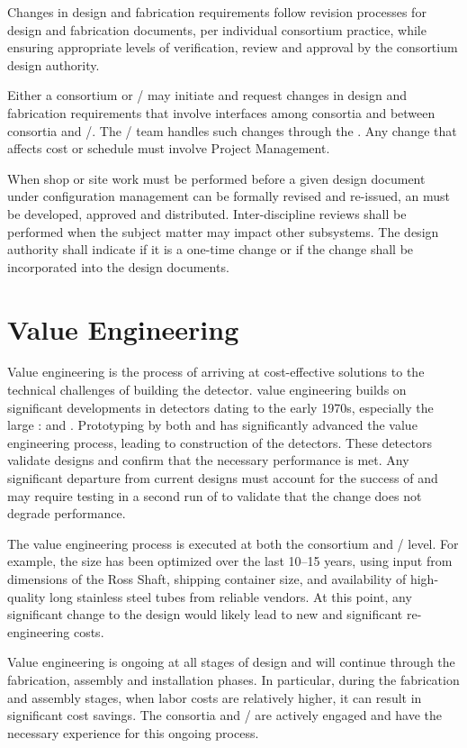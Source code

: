 Changes in design and fabrication requirements follow revision
processes for design and fabrication documents, per individual
consortium practice, while ensuring appropriate levels of
verification, review and approval by the consortium design authority.

Either a consortium or / may initiate and request
changes in design and fabrication requirements that involve interfaces
among consortia and between consortia and /.  The /
team handles such changes through the . Any change that
affects cost or schedule must involve Project Management.

When shop or site work must be performed before a given 
design
document under configuration management can be formally revised and re-issued, 
an  must be developed, approved and distributed. 
Inter-discipline reviews shall be
performed when the  subject matter may impact other
subsystems. The design authority shall indicate if it is a one-time
change or if the change shall be incorporated into the design
documents. 



\section{Value Engineering}
\label{sec:fdsp-coord-ve}

Value engineering is the process of arriving at cost-effective
solutions to the technical challenges of building the 
detector.  value engineering builds on significant
developments in  detectors dating to the early 1970s,
especially the large :  and
. Prototyping by both  and  has
significantly advanced the value engineering process, leading to
construction of the  detectors. These detectors validate
 designs and confirm that the necessary performance is
met. Any significant departure from current designs must account for
the success of   and may require testing in a second
run of  to validate that the change does not degrade performance. 

The value engineering process is executed at both the consortium and
/ level. For example, the  size has been optimized
over the last 10--15 years, using input from dimensions of the Ross
Shaft, shipping container size, and availability of high-quality long
stainless steel tubes from reliable vendors.  At this point, any
significant change to the  design would likely lead to new
and significant re-engineering costs.

Value engineering is ongoing at all stages of design and will continue
through the fabrication, assembly and installation phases. In
particular, during the fabrication and assembly stages, when labor costs
are relatively higher, it can result in significant cost savings. The
consortia and / are actively engaged and have the necessary
experience for this ongoing process.
